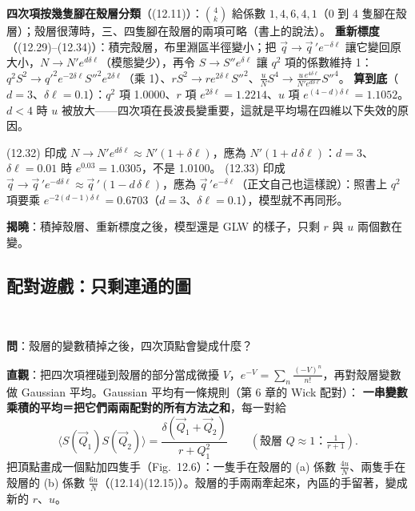 \textbf{四次項按幾隻腳在殼層分類}（(12.11)）：$\binom4k$ 給係數 $1,4,6,4,1$（0 到 4 隻腳在殼層）；殼層很薄時，三、四隻腳在殼層的兩項可略（書上的說法）。
\textbf{重新標度}（(12.29)--(12.34)）：積完殼層，布里淵區半徑變小；把 $\vec q\to\vec q\,'e^{-\delta\ell}$ 讓它變回原大小，$N\to N'e^{d\delta\ell}$（模態變少），再令 $S\to S''e^{\delta\ell}$ 讓 $q^2$ 項的係數維持 1：
$q^2S^2\to q'^2e^{-2\delta\ell}S''^2e^{2\delta\ell}$（乘 1）、$rS^2\to re^{2\delta\ell}S''^2$、$\frac uNS^4\to\frac{u\,e^{4\delta\ell}}{N'e^{d\delta\ell}}S''^4$。
\textbf{算到底}（$d=3$、$\delta\ell=0.1$）：$q^2$ 項 1.0000、$r$ 項 $e^{2\delta\ell}=1.2214$、$u$ 項 $e^{(4-d)\delta\ell}=1.1052$。$d<4$ 時 $u$ 被放大——四次項在長波長變重要，這就是平均場在四維以下失效的原因。
\begin{errbox}[p.~295，(12.32)(12.33)]
(12.32) 印成 $N\to N'e^{d\delta\ell}\approx N'(1+\delta\ell)$，應為 $N'(1+d\,\delta\ell)$：$d=3$、$\delta\ell=0.01$ 時 $e^{0.03}=1.0305$，不是 1.0100。
(12.33) 印成 $\vec q\to\vec q\,'e^{-d\delta\ell}\approx\vec q\,'(1-d\,\delta\ell)$，應為 $\vec q\,'e^{-\delta\ell}$（正文自己也這樣說）：照書上 $q^2$ 項要乘 $e^{-2(d-1)\delta\ell}=0.6703$（$d=3$、$\delta\ell=0.1$），模型就不再同形。
\end{errbox}

\textbf{揭曉}：積掉殼層、重新標度之後，模型還是 GLW 的樣子，只剩 $r$ 與 $u$ 兩個數在變。

\subsection{配對遊戲：只剩連通的圖}
\leavevmode{}\ \par\nopagebreak

\textbf{問}：殼層的變數積掉之後，四次頂點會變成什麼？

\textbf{直觀}：把四次項裡碰到殼層的部分當成微擾 $V$，$e^{-V}=\sum_n\frac{(-V)^n}{n!}$，再對殼層變數做 Gaussian 平均。Gaussian 平均有一條規則（第 6 章的 Wick 配對）：
\textbf{一串變數乘積的平均＝把它們兩兩配對的所有方法之和}，每一對給
\[\big\langle S(\vec Q_1)S(\vec Q_2)\big\rangle=\frac{\delta(\vec Q_1+\vec Q_2)}{r+Q_1^2}\qquad(\text{殼層 }Q\approx1\text{：}\tfrac1{r+1}).\tag{12:S-2}\]
把頂點畫成一個點加四隻手（Fig.~12.6）：一隻手在殼層的 (a) 係數 $\frac{4u}N$、兩隻手在殼層的 (b) 係數 $\frac{6u}N$（(12.14)(12.15)）。殼層的手兩兩牽起來，內區的手留著，變成新的 $r$、$u$。

